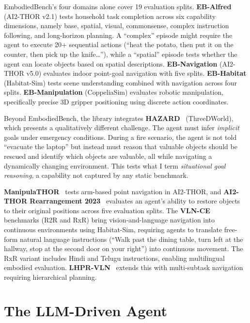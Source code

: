 EmbodiedBench's four domains alone cover 19 evaluation splits. \textbf{EB-Alfred} (AI2-THOR v2.1) tests household task completion across six capability dimensions, namely base, spatial, visual, commonsense, complex instruction following, and long-horizon planning. A ``complex'' episode might require the agent to execute 20+ sequential actions (``heat the potato, then put it on the counter, then pick up the knife\ldots''), while a ``spatial'' episode tests whether the agent can locate objects based on spatial descriptions. \textbf{EB-Navigation} (AI2-THOR v5.0) evaluates indoor point-goal navigation with five splits. \textbf{EB-Habitat} (Habitat-Sim) tests scene understanding combined with navigation across four splits. \textbf{EB-Manipulation} (CoppeliaSim) evaluates robotic manipulation, specifically precise 3D gripper positioning using discrete action coordinates.

Beyond EmbodiedBench, the library integrates \textbf{HAZARD}~\cite{zhou2024hazardchallengeembodieddecision} (ThreeDWorld), which presents a qualitatively different challenge. The agent must infer \textit{implicit} goals under emergency conditions. During a fire scenario, the agent is not told ``evacuate the laptop'' but instead must reason that valuable objects should be rescued and identify which objects are valuable, all while navigating a dynamically changing environment. This tests what I term \textit{situational goal reasoning}, a capability not captured by any static benchmark.

\textbf{ManipulaTHOR}~\cite{ehsani2021manipulathorframeworkvisualobject} tests arm-based point navigation in AI2-THOR, and \textbf{AI2-THOR Rearrangement 2023}~\cite{RoomR} evaluates an agent's ability to restore objects to their original positions across five evaluation splits. The \textbf{VLN-CE}~\cite{krantz2020navgraphvisionandlanguagenavigationcontinuous} benchmarks (R2R and RxR) bring vision-and-language navigation into continuous environments using Habitat-Sim, requiring agents to translate free-form natural language instructions (``Walk past the dining table, turn left at the hallway, stop at the second door on your right'') into continuous movement. The RxR variant includes Hindi and Telugu instructions, enabling multilingual embodied evaluation. \textbf{LHPR-VLN}~\cite{song2025longhorizonvisionlanguagenavigationplatform} extends this with multi-subtask navigation requiring hierarchical planning.

\section{The LLM-Driven Agent}

